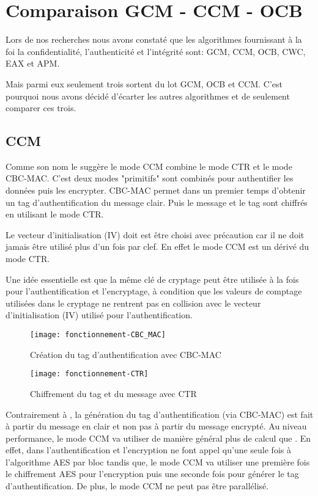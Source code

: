 \chapter{Comparaison GCM - CCM - OCB}

Lors de nos recherches nous avons constaté que les algorithmes fournissant à la foi la confidentialité, l'authenticité et l'intégrité sont: GCM, CCM, OCB, CWC, EAX et APM.

Mais parmi eux seulement trois sortent du lot GCM, OCB et CCM. C'est pourquoi nous avons décidé d'écarter les autres algorithmes et de seulement comparer ces trois.


\section{CCM}

Comme son nom le suggère le mode CCM combine le mode CTR et le mode CBC-MAC. C'est deux modes "primitifs" sont combinés pour authentifier les données puis les encrypter. CBC-MAC permet dans un premier temps d'obtenir un tag d'authentification du message clair. Puis le message et le tag sont chiffrés en utilisant le mode CTR.



Le vecteur d'initialisation (IV) doit est être choisi avec précaution car il ne doit jamais être utilisé plus d'un fois par clef. En effet le mode CCM est un dérivé du mode CTR.



Une idée essentielle est que la même clé de cryptage peut être utilisée à la fois pour l'authentification et l'encryptage, à condition que les valeurs de comptage utilisées dans le cryptage ne rentrent pas en collision avec le vecteur d'initialisation (IV) utilisé pour l'authentification.


\begin{figure}[!h]
  \centering
  \texttt{[image: fonctionnement-CBC\_MAC]}
  \caption{Création du tag d'authentification avec CBC-MAC}
  \label{Création du tag d'authentification avec CBC-MAC}
\end{figure}

\begin{figure}[!h]
  \centering
  \texttt{[image: fonctionnement-CTR]}
  \caption{Chiffrement du tag et du message avec CTR}
  \label{Chiffrement du tag et du message avec CTR}
\end{figure}


Contrairement à \aes, la génération du tag d'authentification (via CBC-MAC) est fait à partir du message en clair et non pas à partir du message encrypté. Au niveau performance, le mode CCM va utiliser de manière général plus de calcul que \aes. En effet, dans \aes l'authentification et l'encryption ne font appel qu'une seule fois à l'algorithme AES par bloc tandis que, le mode CCM va utiliser une première fois le chiffrement AES pour l'encryption puis une seconde fois pour générer le tag d'authentification. De plus, le mode CCM ne peut pas être parallélisé.


